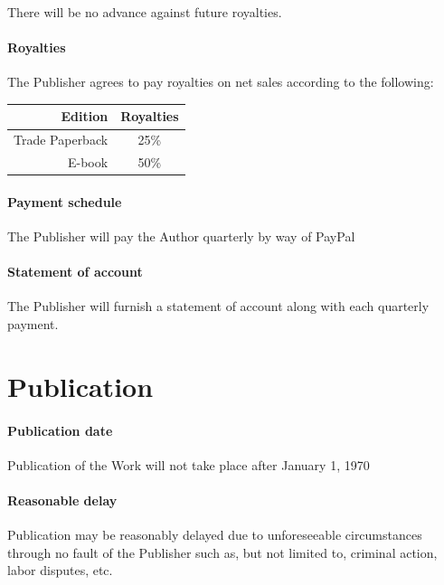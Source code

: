 \documentclass[12pt,letterpaper]{article}
\def\PrintRoyalties{25\%}
\def\DigitalRoyalties{50\%}
\def\PaymentMechanism{PayPal} %
\def\PublicationDate{January 1, 1970}
\begin{document}
There will be no advance against future royalties.

\paragraph{Royalties}

The Publisher agrees to pay royalties on net sales according to the following:

\begin{center}
\begin{tabular}{r c}
    \textbf{Edition} & \textbf{Royalties} \\ \hline
    Trade Paperback & \PrintRoyalties \\
    E-book & \DigitalRoyalties \\
    \hline
\end{tabular}
\end{center}

\paragraph{Payment schedule}

The Publisher will pay the Author quarterly by way of \PaymentMechanism

\paragraph{Statement of account}

The Publisher will furnish a statement of account along with each quarterly payment.

\section{Publication}

\paragraph{Publication date}

Publication of the Work will not take place after \PublicationDate

\paragraph{Reasonable delay}

Publication may be reasonably delayed due to unforeseeable circumstances through no fault of the Publisher such as, but not limited to, criminal action, labor disputes, etc.
\end{document}
